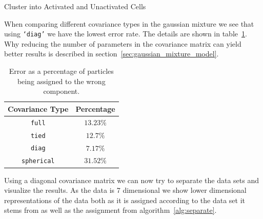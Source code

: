 \begin{algorithm}[H] \label{alg:separate}
	\SetAlgoLined
	\DontPrintSemicolon
	\LinesNumbered
	\caption{Cluster into Activated and Unactivated Cells}
	
	
	\BlankLine
\end{algorithm}

When comparing different covariance types in the gaussian mixture we see that using \texttt{‘diag’} we have the lowest error rate. The details are shown in table~\ref{tab:covariance_type_comparison}. Why reducing the number of parameters in the covariance matrix can yield better results is described in section~\ref{sec:gaussian_mixture_model}.

\begin{table}[h!]
	\centering
	\begin{tabular}{|c|c|}
		\hline
		\textbf{Covariance Type} & \textbf{Percentage}\\
		\hline
		\hline
		\texttt{full} & $13.23\%$ \\
		\hline
		\texttt{tied} & $12.7\%$ \\
		\hline
		\texttt{diag} & $7.17\%$ \\
		\hline
		\texttt{spherical} & $31.52\%$ \\
		\hline
	\end{tabular}
	\caption{Error as a percentage of particles being assigned to the wrong component.}
	\label{tab:covariance_type_comparison}
\end{table}

Using a diagonal covariance matrix we can now try to separate the data sets and visualize the results. As the data is 7 dimensional we show lower dimensional representations of the data both as it is assigned according to the data set it stems from as well as the assignment from algorithm~\ref{alg:separate}.

